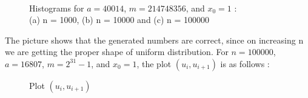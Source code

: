 \documentclass[11pt]{article}
\begin{document}
\begin{figure}[H]
  \centering
  \captionsetup{justification=centering}
  \hspace{10mm}
  \\
    \caption{Histograms for $a = 40014$, $m = 214748356$, and $x_{0} = 1$ :\\(a) n = 1000, (b) n = 10000 and (c) n = 100000}
\end{figure}

The picture shows that the generated numbers are correct, since on increasing n we are getting the proper shape of uniform distribution.
\newpage
For $n = 100000$, $a = 16807$, $m = 2^{31} - 1$, and $x_{0} = 1$, the plot $(u_i, u_{i+1})$ is as follows :

\begin{figure}[H]
  \centering
      \caption{Plot $(u_i, u_{i+1})$}
\end{figure}
\end{document}
